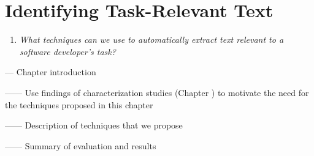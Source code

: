 \setcounter{chapter}{4}
\setcounter{rq}{1}


\chapter{Identifying Task-Relevant Text}
\label{ch:identifying}



\vspace{1mm}

\begin{enumerate}[label=\textit{RQ\arabic*},leftmargin=1.4cm]

\item \textit{What techniques can we use to automatically extract text relevant to a software developer's task?} 

\end{enumerate}

\vspace{1mm}

--- Chapter introduction 

------ Use findings of characterization studies (Chapter ) to motivate the need for the techniques proposed in this chapter

------ Description of techniques that we propose


------ Summary of evaluation and results



\clearpage








